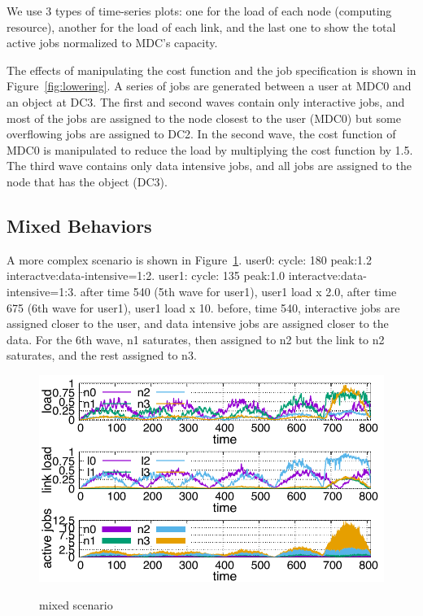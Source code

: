 We use 3 types of time-series plots: one for the load of each node
(computing resource), another for the load of each link, and the last
one to show the total active jobs normalized to MDC's capacity.

The effects of manipulating the cost function and the job
specification is shown in Figure~\ref{fig:lowering}.
A series of jobs are generated between a user at MDC0 and an object at DC3.
The first and second waves contain only interactive jobs, and most of
the jobs are assigned to the node closest to the user (MDC0) but some
overflowing jobs are assigned to DC2.
In the second wave, the cost function of MDC0 is manipulated to reduce
the load by multiplying the cost function by 1.5.
The third wave contains only data intensive jobs, and all jobs are
assigned to the node that has the object (DC3).

\subsection{Mixed Behaviors}

A more complex scenario is shown in Figure~\ref{fig:mixed}.
user0: cycle: 180  peak:1.2 interactve:data-intensive=1:2.
user1: cycle: 135  peak:1.0  interactve:data-intensive=1:3.
after time 540 (5th wave for user1), user1 load x 2.0, 
after time 675 (6th wave for user1), user1 load x 10.
before, time 540, interactive jobs are assigned closer to the user,
and data intensive jobs are assigned closer to the data.
For the 6th wave, n1 saturates, then assigned to n2 but the link to n2
saturates, and the rest assigned to n3.

\begin{figure}[tb]
  \begin{center}
    \includegraphics[width=1.0\columnwidth]{simu2.pdf}
    \vspace{-2.0ex}
    \caption{mixed scenario}
    \label{fig:mixed}
  \end{center}
\end{figure}
